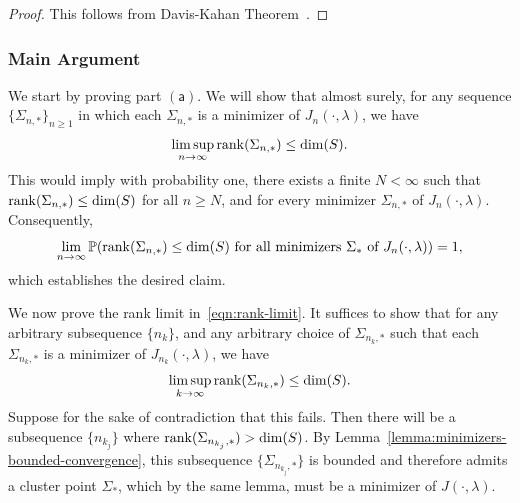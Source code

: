 \documentclass[sn-mathphys-num]{sn-jnl}%
\numberwithin{equation}{section}
\renewcommand{\P}{\mathbb{P}}
\newcommand{\rank}{{\rm rank}}
\theoremstyle{thmstyleone}%
\theoremstyle{thmstyletwo}%
\theoremstyle{thmstylethree}%
\begin{document}
\vspace{.5em} 
\begin{proof}
This follows from Davis-Kahan Theorem~\cite[Section V]{StewartSu90}. 
\end{proof}

\vspace{.5em} 

\subsubsection{Main Argument}
\indent\indent
We start by proving part $\mathsf{(a)}$. We will show that almost surely, for any sequence 
$\{\Sigma_{n,*}\}_{n\ge 1}$ in which each $\Sigma_{n,*}$ is a minimizer of $J_n(\cdot,\lambda)$, we have
\begin{equation}
\label{eqn:rank-limit}
	\limsup_{n \to \infty} \rank(\Sigma_{n,*}) \le \dim(S).
\end{equation}
This would imply with probability one, there exists a finite $N< \infty$ such that $\rank(\Sigma_{n, *}) \le \dim(S)$ for all $n \ge N$, 
and for every minimizer $\Sigma_{n,*}$ of $J_n(\cdot,\lambda)$. Consequently, 
\begin{equation*}
\lim_{n \to \infty} 
\P\!\left(
\rank(\Sigma_{n, *}) \le \dim(S)
\ \text{for all minimizers } \Sigma_* \text{ of } J_n(\cdot,\lambda)
\right) = 1,
\end{equation*} 
which establishes the desired claim.

We now prove the rank limit in~\eqref{eqn:rank-limit}. It suffices to show that for any arbitrary subsequence $\{n_k\}$, 
and any arbitrary choice of $\Sigma_{n_k,*}$ such that each $\Sigma_{n_k,*}$ is a minimizer of $J_{n_k}(\cdot,\lambda)$, we have
\begin{equation}
	\limsup_{k \to \infty} \rank(\Sigma_{n_k,*}) \le \dim(S).
\end{equation}
Suppose for the sake of contradiction that this fails. Then there will be a subsequence $\{n_{k_j}\}$ where
$\rank(\Sigma_{n_{k_j},*}) > \dim(S)$. By Lemma~\ref{lemma:minimizers-bounded-convergence}, this 
subsequence $\{\Sigma_{n_{k_j},*}\}$ is bounded and therefore admits a cluster point $\Sigma_*$, which 
by the same lemma, must be a minimizer of $J(\cdot,\lambda)$. 
\end{document}
